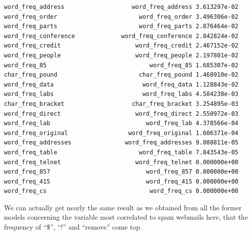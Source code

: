 \documentclass[
  11pt,
]{article}
\newenvironment{Shaded}{\begin{snugshade}}{\end{snugshade}}
\newcommand{\AttributeTok}[1]{\textcolor[rgb]{0.77,0.63,0.00}{#1}}
\newcommand{\DecValTok}[1]{\textcolor[rgb]{0.00,0.00,0.81}{#1}}
\newcommand{\FunctionTok}[1]{\textcolor[rgb]{0.00,0.00,0.00}{#1}}
\newcommand{\NormalTok}[1]{#1}
\newcommand{\OtherTok}[1]{\textcolor[rgb]{0.56,0.35,0.01}{#1}}
\newcommand{\SpecialCharTok}[1]{\textcolor[rgb]{0.00,0.00,0.00}{#1}}
\newcommand{\StringTok}[1]{\textcolor[rgb]{0.31,0.60,0.02}{#1}}
\begin{document}
\begin{verbatim}
word_freq_address                   word_freq_address 3.613297e-02
word_freq_order                       word_freq_order 3.496306e-02
word_freq_parts                       word_freq_parts 2.876464e-02
word_freq_conference             word_freq_conference 2.842824e-02
word_freq_credit                     word_freq_credit 2.467152e-02
word_freq_people                     word_freq_people 2.197801e-02
word_freq_85                             word_freq_85 1.685307e-02
char_freq_pound                       char_freq_pound 1.468910e-02
word_freq_data                         word_freq_data 1.128843e-02
word_freq_labs                         word_freq_labs 4.584238e-03
char_freq_bracket                   char_freq_bracket 3.254895e-03
word_freq_direct                     word_freq_direct 2.550972e-03
word_freq_lab                           word_freq_lab 4.378566e-04
word_freq_original                 word_freq_original 1.606371e-04
word_freq_addresses               word_freq_addresses 9.088811e-05
word_freq_table                       word_freq_table 7.843543e-05
word_freq_telnet                     word_freq_telnet 0.000000e+00
word_freq_857                           word_freq_857 0.000000e+00
word_freq_415                           word_freq_415 0.000000e+00
word_freq_cs                             word_freq_cs 0.000000e+00
\end{verbatim}

We can actually get nearly the same result as we obtained from all the former models concerning the variable most correlated to spam webmails here, that the frequency of ``\$'', ``!'' and ``remove'' come top.

\begin{Shaded}
\end{Shaded}
\end{document}
